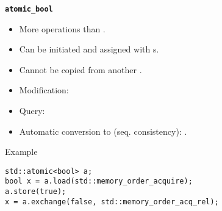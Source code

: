 \begin{frame}[t,fragile]{\texttt{\textbf{atomic\_bool}}}
\begin{itemize}
  \item More operations than .
    \item Can be initiated and assigned with s.
    \item Cannot be copied from another .
    \item Modification: 
    \item Query: 
    \item Automatic conversion to  (seq. consistency): .
\end{itemize}
\begin{block}{Example}
\begin{lstlisting}
std::atomic<bool> a;
bool x = a.load(std::memory_order_acquire);
a.store(true);
x = a.exchange(false, std::memory_order_acq_rel);
\end{lstlisting}
\end{block}
\end{frame}

